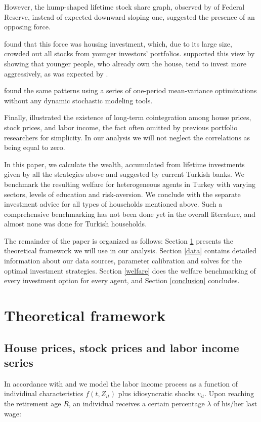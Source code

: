 \documentclass[]{elsarticle}
\begin{document}
However, the hump-shaped lifetime stock share graph, observed by \citet{chang} of Federal Reserve, instead of expected downward sloping one, suggested the presence of an opposing force.

\citet{cocco} found that this force was housing investment, which, due to its large size, crowded out all stocks from younger investors' portfolios. \citet{flavin} supported this view by showing that younger people, who already own the house, tend to invest more aggressively, as was expected by \citet{bodie}.

\citet{munk} found the same patterns using a series of one-period mean-variance optimizations without any dynamic stochastic modeling tools.

Finally, \citet{ascheberg} illustrated the existence of long-term cointegration among house prices, stock prices, and labor income, the fact often omitted by previous portfolio researchers for simplicity. In our analysis we will not neglect the correlations as being equal to zero. 

In this paper, we calculate the wealth, accumulated from lifetime investments given by all the strategies above and suggested by current Turkish banks. We benchmark the resulting welfare for heterogeneous agents in Turkey with varying sectors, levels of education and risk-aversion. We conclude with the separate investment advice for all types of households mentioned above. Such a comprehensive benchmarking has not been done yet in the overall literature, and almost none was done for Turkish households.

The remainder of the paper is organized as follows: Section \ref{model} presents the theoretical framework we will use in our analysis. Section \ref{data} contains detailed information about our data sources, parameter calibration and solves for the optimal investment strategies. Section \ref{welfare} does the welfare benchmarking of every investment option for every agent, and Section \ref{conclusion} concludes.


\section{Theoretical framework}
\label{model}

\subsection{House prices, stock prices and labor income series}
In accordance with \citet{ccgm} and \citet{olear} we model the labor income process as a function of individiual characteristics $f(t, Z_{it})$ plus idiosyncratic shocks $v_{it}$. Upon reaching the retirement age $R$, an individual receives a certain percentage $\lambda$ of his/her last wage:
\end{document}
